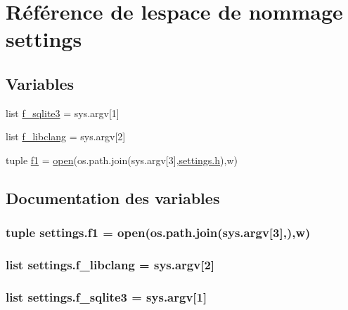 \hypertarget{namespacesettings}{}\section{Référence de l\textquotesingle{}espace de nommage settings}
\label{namespacesettings}
\subsection*{Variables}
\begin{DoxyCompactItemize}
\item 
list \hyperlink{namespacesettings_aa56b47edbcaab8233cca106b9d6dcda6}{f\+\_\+sqlite3} = sys.\+argv\mbox{[}1\mbox{]}
\item 
list \hyperlink{namespacesettings_abe1b40f882d76ad064ae9199be21a2cd}{f\+\_\+libclang} = sys.\+argv\mbox{[}2\mbox{]}
\item 
tuple \hyperlink{namespacesettings_a4007f853424556c5066a8d19b256ac0f}{f1} = \hyperlink{structcmd_8h_a2c4414339f388561554c2deab11a1a07}{open}(os.\+path.\+join(sys.\+argv\mbox{[}3\mbox{]},\textquotesingle{}\hyperlink{060__command__switch_8tcl_af96fd0966e32a310a0778d2e5c357700}{settings.\+h}\textquotesingle{}),\textquotesingle{}w\textquotesingle{})
\end{DoxyCompactItemize}


\subsection{Documentation des variables}
\hypertarget{namespacesettings_a4007f853424556c5066a8d19b256ac0f}{}
\subsubsection[{f1}]{\setlength{\rightskip}{0pt plus 5cm}tuple settings.\+f1 = {\bf open}(os.\+path.\+join(sys.\+argv\mbox{[}3\mbox{]},\textquotesingle{}),\textquotesingle{}w\textquotesingle{})}\label{namespacesettings_a4007f853424556c5066a8d19b256ac0f}
\hypertarget{namespacesettings_abe1b40f882d76ad064ae9199be21a2cd}{}
\subsubsection[{f\+\_\+libclang}]{\setlength{\rightskip}{0pt plus 5cm}list settings.\+f\+\_\+libclang = sys.\+argv\mbox{[}2\mbox{]}}\label{namespacesettings_abe1b40f882d76ad064ae9199be21a2cd}
\hypertarget{namespacesettings_aa56b47edbcaab8233cca106b9d6dcda6}{}
\subsubsection[{f\+\_\+sqlite3}]{\setlength{\rightskip}{0pt plus 5cm}list settings.\+f\+\_\+sqlite3 = sys.\+argv\mbox{[}1\mbox{]}}\label{namespacesettings_aa56b47edbcaab8233cca106b9d6dcda6}
